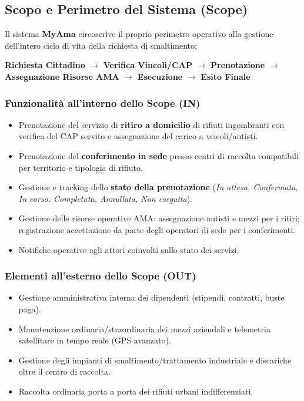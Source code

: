 \subsection{Scopo e Perimetro del Sistema (Scope)}
Il sistema \textbf{MyAma} circoscrive il proprio perimetro operativo alla gestione dell'intero ciclo di vita della richiesta di smaltimento:
\begin{center}
\textbf{Richiesta Cittadino} $\longrightarrow$ \textbf{Verifica Vincoli/CAP} $\longrightarrow$ \textbf{Prenotazione} $\longrightarrow$ \textbf{Assegnazione Risorse AMA} $\longrightarrow$ \textbf{Esecuzione} $\longrightarrow$ \textbf{Esito Finale}
\end{center}

\subsubsection{Funzionalità all'interno dello Scope (IN)}
\begin{itemize}
    \item Prenotazione del servizio di \textbf{ritiro a domicilio} di rifiuti ingombranti con verifica del CAP servito e assegnazione del carico a veicoli/autisti.
    \item Prenotazione del \textbf{conferimento in sede} presso centri di raccolta compatibili per territorio e tipologia di rifiuto.
    \item Gestione e tracking dello \textbf{stato della prenotazione} (\textit{In attesa, Confermata, In corso, Completata, Annullata, Non eseguita}).
    \item Gestione delle risorse operative AMA: assegnazione autisti e mezzi per i ritiri; registrazione accettazione da parte degli operatori di sede per i conferimenti.
    \item Notifiche operative agli attori coinvolti sullo stato dei servizi.
\end{itemize}

\subsubsection{Elementi all'esterno dello Scope (OUT)}
\begin{itemize}
    \item Gestione amministrativa interna dei dipendenti (stipendi, contratti, buste paga).
    \item Manutenzione ordinaria/straordinaria dei mezzi aziendali e telemetria satellitare in tempo reale (GPS avanzato).
    \item Gestione degli impianti di smaltimento/trattamento industriale e discariche oltre il centro di raccolta.
    \item Raccolta ordinaria porta a porta dei rifiuti urbani indifferenziati.
\end{itemize}

